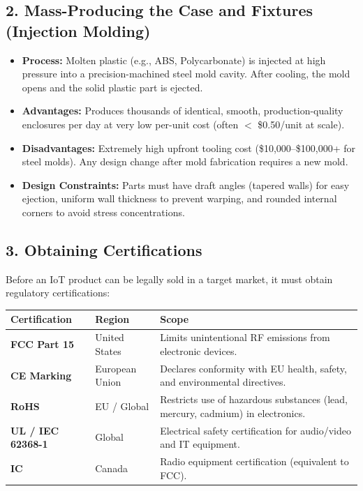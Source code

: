 \subsection{2. Mass-Producing the Case and Fixtures (Injection Molding)}
\begin{itemize}
  \item   \textbf{Process:} Molten plastic (e.g., ABS, Polycarbonate) is injected at high pressure into a precision-machined steel mold cavity. After cooling, the mold opens and the solid plastic part is ejected.
  \item   \textbf{Advantages:} Produces thousands of identical, smooth, production-quality enclosures per day at very low per-unit cost (often $<$ \$0.50/unit at scale).
  \item   \textbf{Disadvantages:} Extremely high upfront tooling cost (\$10,000–\$100,000+ for steel molds). Any design change after mold fabrication requires a new mold.
  \item   \textbf{Design Constraints:} Parts must have draft angles (tapered walls) for easy ejection, uniform wall thickness to prevent warping, and rounded internal corners to avoid stress concentrations.
\end{itemize}


\subsection{3. Obtaining Certifications}
Before an IoT product can be legally sold in a target market, it must obtain regulatory certifications:

\begin{table}[H]
\centering
\begin{tabular}{|p{}|p{}|p{}|}
\hline
Certification & Region & Scope \\
\hline
\textbf{FCC Part 15} & United States & Limits unintentional RF emissions from electronic devices. \\
\hline
\textbf{CE Marking} & European Union & Declares conformity with EU health, safety, and environmental directives. \\
\hline
\textbf{RoHS} & EU / Global & Restricts use of hazardous substances (lead, mercury, cadmium) in electronics. \\
\hline
\textbf{UL / IEC 62368-1} & Global & Electrical safety certification for audio/video and IT equipment. \\
\hline
\textbf{IC} & Canada & Radio equipment certification (equivalent to FCC). \\
\hline
\end{tabular}
\end{table}

